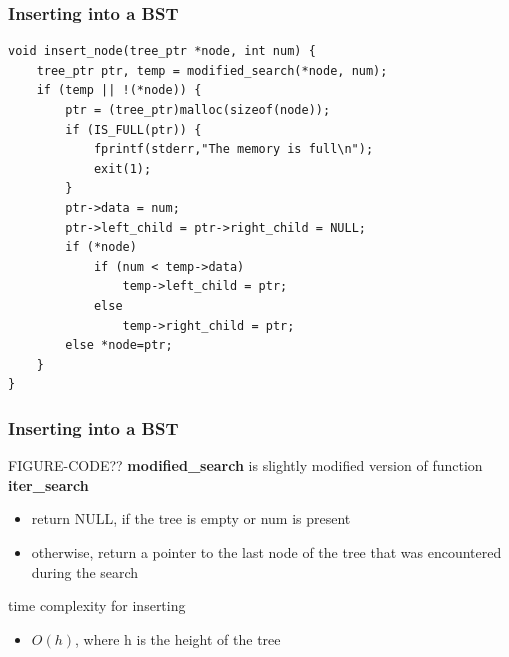 \documentclass[newPxFont,sthlmFooter,nooffset]{beamer}
\begin{document}
\begin{frame}[t, fragile]
  \frametitle{Inserting into a BST}
  \begin{lstlisting}
void insert_node(tree_ptr *node, int num) { 
    tree_ptr ptr, temp = modified_search(*node, num); 
    if (temp || !(*node)) {
        ptr = (tree_ptr)malloc(sizeof(node)); 
        if (IS_FULL(ptr)) {
            fprintf(stderr,"The memory is full\n"); 
            exit(1);
        }
        ptr->data = num;
        ptr->left_child = ptr->right_child = NULL; 
        if (*node)
            if (num < temp->data) 
                temp->left_child = ptr;
            else
                temp->right_child = ptr;
        else *node=ptr; 
    }
}
 \end{lstlisting}
\end{frame}


\begin{frame}[t, fragile]
  \frametitle{Inserting into a BST}

FIGURE-CODE??
\textbf{modified\_search} is slightly modified version of function \textbf{iter\_search}
\begin{itemize}
\item return NULL, if the tree is empty or num is present
\item otherwise, return a pointer to the last node of the tree that
  was encountered during the search
\end{itemize}

time complexity for inserting
\begin{itemize}
\item  $O(h)$, where h is the height of the tree
\end{itemize}

\end{frame}
\end{document}
